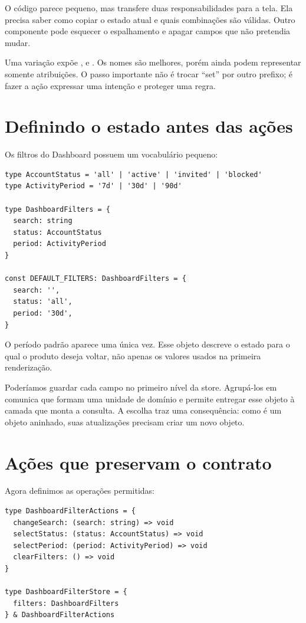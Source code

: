 O código parece pequeno, mas transfere duas responsabilidades para a tela. Ela
precisa saber como copiar o estado atual e quais combinações são válidas. Outro
componente pode esquecer o espalhamento e apagar campos que não pretendia mudar.

Uma variação expõe ,  e
. Os nomes são melhores, porém ainda podem representar somente
atribuições. O passo importante não é trocar ``set'' por outro prefixo; é fazer
a ação expressar uma intenção e proteger uma regra.

\section{Definindo o estado antes das ações}

Os filtros do Dashboard possuem um vocabulário pequeno:

\begin{lstlisting}[caption={Tipos e valores iniciais dos filtros.},label={lst:dashboard-filter-types}]
type AccountStatus = 'all' | 'active' | 'invited' | 'blocked'
type ActivityPeriod = '7d' | '30d' | '90d'

type DashboardFilters = {
  search: string
  status: AccountStatus
  period: ActivityPeriod
}

const DEFAULT_FILTERS: DashboardFilters = {
  search: '',
  status: 'all',
  period: '30d',
}
\end{lstlisting}

O período padrão aparece uma única vez. Esse objeto descreve o estado para o qual
o produto deseja voltar, não apenas os valores usados na primeira renderização.

Poderíamos guardar cada campo no primeiro nível da store. Agrupá-los em
 comunica que formam uma unidade de domínio e permite entregar
esse objeto à camada que monta a consulta. A escolha traz uma consequência:
como  é um objeto aninhado, suas atualizações precisam criar um
novo objeto.

\section{Ações que preservam o contrato}

Agora definimos as operações permitidas:

\begin{lstlisting}[caption={Contrato orientado às intenções do Dashboard.}]
type DashboardFilterActions = {
  changeSearch: (search: string) => void
  selectStatus: (status: AccountStatus) => void
  selectPeriod: (period: ActivityPeriod) => void
  clearFilters: () => void
}

type DashboardFilterStore = {
  filters: DashboardFilters
} & DashboardFilterActions
\end{lstlisting}

